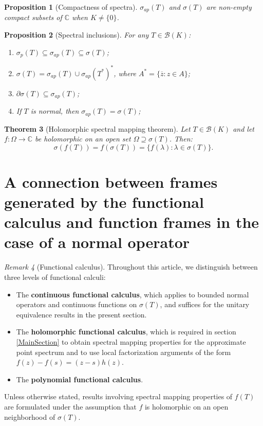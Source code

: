 \documentclass[a4paper,11pt]{article}
\theoremstyle{plain}
\newtheorem{theorem}{Theorem}[section]
\newtheorem{proposition}[theorem]{Proposition}
\theoremstyle{definition}
\theoremstyle{remark}
\newtheorem{remark}[theorem]{Remark}
\begin{document}
\begin{proposition}[Compactness of spectra]
$\sigma_{ap}(T)$ and $\sigma(T)$ are non-empty compact subsets of $\mathbb{C}$ when $K \neq \{0\}$.
\end{proposition}

\begin{proposition}[Spectral inclusions]
\label{PropSpectralInclusions}
For any $T \in \mathcal{B}(K)$:
\begin{enumerate}[label=(\roman*)]
\item $\sigma_p(T) \subseteq \sigma_{ap}(T) \subseteq \sigma(T)$;
\item $\sigma(T) = \sigma_{ap}(T) \cup \sigma_{ap}(T^*)^*$, where $A^* = \{\overline{z} : z \in A\}$;
\item $\partial \sigma(T) \subseteq \sigma_{ap}(T)$;
\item If $T$ is normal, then $\sigma_{ap}(T) = \sigma(T)$;
\end{enumerate}
\end{proposition}

\begin{theorem}[Holomorphic spectral mapping theorem]
\label{ThHolomorphicSpectralMapping}
Let $T \in \mathcal{B}(K)$ and let $f: \Omega \to \mathbb{C}$ be holomorphic on an open set $\Omega \supseteq \sigma(T)$. Then:
\[\sigma(f(T)) = f(\sigma(T)) = \{f(\lambda) : \lambda \in \sigma(T)\}.\]
\end{theorem}

\section{A connection between frames generated by the functional calculus and function frames in the case of a normal operator}
\label{SectionOrbitFrames}

\begin{remark}[Functional calculus]\label{rem:functional-calculus}
Throughout this article, we distinguish between three levels of functional
calculi:
\begin{itemize}
\item The \textbf{continuous functional calculus}, which applies to bounded
  normal operators and continuous functions on $\sigma(T)$, and suffices for
  the unitary equivalence results in the present section.
  
\item The \textbf{holomorphic functional calculus}, which is required in
  section \ref{MainSection}  to obtain spectral mapping properties for the approximate point
  spectrum and to use local factorization arguments of the form
  $f(z)-f(s)=(z-s)h(z)$.
  
  \item The \textbf{polynomial functional calculus}.
\end{itemize}
Unless otherwise stated, results involving spectral mapping properties of $f(T)$ are formulated under the assumption that $f$ is holomorphic
on an open neighborhood of $\sigma(T)$.
\end{remark}
\end{document}

